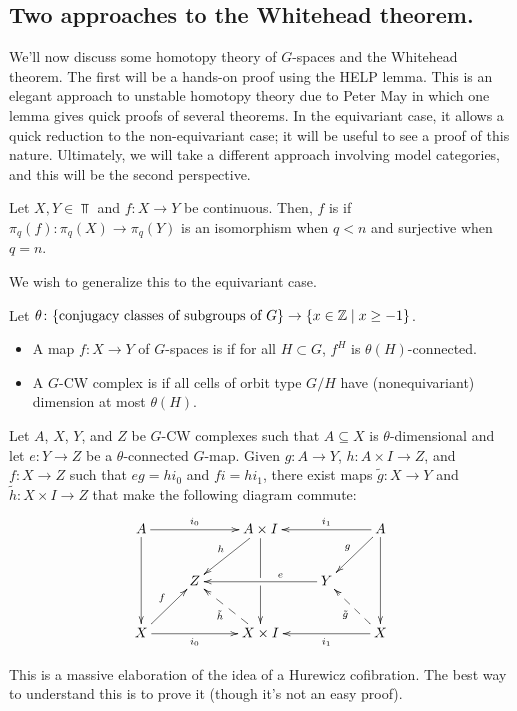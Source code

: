 \subsection*{Two approaches to the Whitehead theorem.}
We'll now discuss some homotopy theory of $G$-spaces and the Whitehead theorem. The first will be a hands-on proof
using the HELP lemma. This is an elegant approach to unstable homotopy theory due to Peter May in which one lemma
gives quick proofs of several theorems. In the equivariant case, it allows a quick reduction to the non-equivariant
case; it will be useful to see a proof of this nature. Ultimately, we will take a different approach involving
model categories, and this will be the second perspective.
\begin{defn}
Let $X,Y\in\Top$ and $f\colon X\to Y$ be continuous. Then, $f$ is 
if $\pi_q(f)\colon\pi_q(X)\to\pi_q(Y)$ is an isomorphism when $q < n$ and surjective when $q = n$.
\end{defn}
We wish to generalize this to the equivariant case.
\begin{defn}
\label{equivariant_connected}
Let $\theta\colon\{\text{conjugacy classes of subgroups of $G$}\}\to\{x\in\mathbb Z\mid x\ge -1\}$.
\begin{itemize}
	\item A map $f\colon X\to Y$ of $G$-spaces is  if for all $H\subset G$, $f^H$ is
	$\theta(H)$-connected.
	\item A $G$-CW complex is  if all cells of orbit type
	$G/H$ have (nonequivariant) dimension at most $\theta(H)$.
\end{itemize}
\end{defn}
\begin{thm}
\label{HELP}
Let $A$, $X$, $Y$, and $Z$ be $G$-CW complexes such that $A\subseteq X$ is $\theta$-dimensional and let $e\colon
Y\to Z$ be a $\theta$-connected $G$-map. Given $g\colon A\to Y$, $h\colon A\times I\to Z$, and $f\colon X\to Z$
such that $eg = hi_0$ and $fi = hi_1$, there exist maps $\tilde g\colon X\to Y$ and $\tilde h\colon X\times I\to Z$
that make the following diagram commute:
\[\xymatrix{
	A \ar[dd] \ar[rr]^-{i_0} && A\times I \ar[dd]|\hole \ar[dl]_-h && \ar[ll]_-{i_1} \ar[dl]_-g A \ar[dd]\\
	& Z && \ar[ll]_(0.35)e Y\\
	X \ar[ur]^-f \ar[rr]_-{i_0} && \ar@{-->}[ul]^-{\tilde h} X\times I && \ar[ll]^-{i_1} \ar@{-->}[ul]^-{\tilde g} X
}\]
\end{thm}
This is a massive elaboration of the idea of a Hurewicz cofibration. The best way to
understand this is to prove it (though it's not an easy proof).

